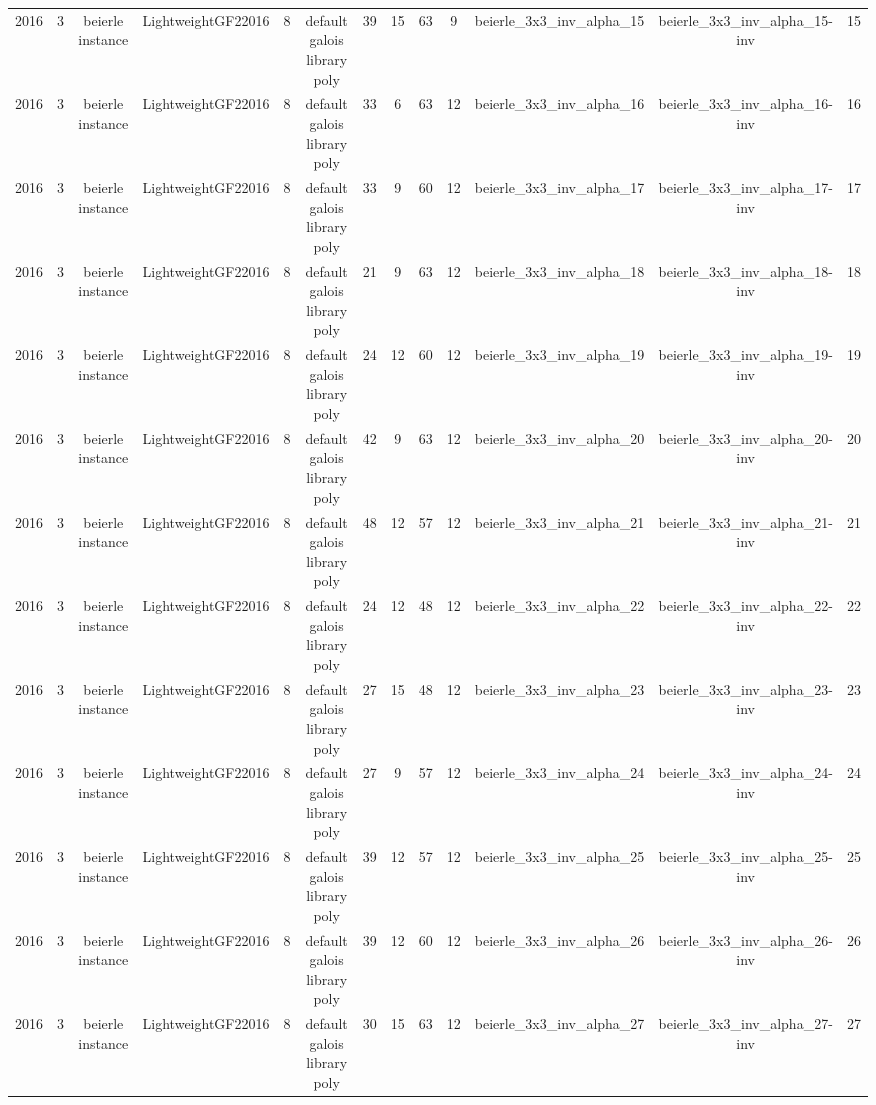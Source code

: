 \begin{tabular}{c c c c c c c c c c c c c}
2016 & 3 & beierle instance & LightweightGF22016 & 8 & default galois library poly & 39 & 15 & 63 & 9 & beierle_3x3_inv_alpha_15 & beierle_3x3_inv_alpha_15-inv & 15 \\
2016 & 3 & beierle instance & LightweightGF22016 & 8 & default galois library poly & 33 & 6 & 63 & 12 & beierle_3x3_inv_alpha_16 & beierle_3x3_inv_alpha_16-inv & 16 \\
2016 & 3 & beierle instance & LightweightGF22016 & 8 & default galois library poly & 33 & 9 & 60 & 12 & beierle_3x3_inv_alpha_17 & beierle_3x3_inv_alpha_17-inv & 17 \\
2016 & 3 & beierle instance & LightweightGF22016 & 8 & default galois library poly & 21 & 9 & 63 & 12 & beierle_3x3_inv_alpha_18 & beierle_3x3_inv_alpha_18-inv & 18 \\
2016 & 3 & beierle instance & LightweightGF22016 & 8 & default galois library poly & 24 & 12 & 60 & 12 & beierle_3x3_inv_alpha_19 & beierle_3x3_inv_alpha_19-inv & 19 \\
2016 & 3 & beierle instance & LightweightGF22016 & 8 & default galois library poly & 42 & 9 & 63 & 12 & beierle_3x3_inv_alpha_20 & beierle_3x3_inv_alpha_20-inv & 20 \\
2016 & 3 & beierle instance & LightweightGF22016 & 8 & default galois library poly & 48 & 12 & 57 & 12 & beierle_3x3_inv_alpha_21 & beierle_3x3_inv_alpha_21-inv & 21 \\
2016 & 3 & beierle instance & LightweightGF22016 & 8 & default galois library poly & 24 & 12 & 48 & 12 & beierle_3x3_inv_alpha_22 & beierle_3x3_inv_alpha_22-inv & 22 \\
2016 & 3 & beierle instance & LightweightGF22016 & 8 & default galois library poly & 27 & 15 & 48 & 12 & beierle_3x3_inv_alpha_23 & beierle_3x3_inv_alpha_23-inv & 23 \\
2016 & 3 & beierle instance & LightweightGF22016 & 8 & default galois library poly & 27 & 9 & 57 & 12 & beierle_3x3_inv_alpha_24 & beierle_3x3_inv_alpha_24-inv & 24 \\
2016 & 3 & beierle instance & LightweightGF22016 & 8 & default galois library poly & 39 & 12 & 57 & 12 & beierle_3x3_inv_alpha_25 & beierle_3x3_inv_alpha_25-inv & 25 \\
2016 & 3 & beierle instance & LightweightGF22016 & 8 & default galois library poly & 39 & 12 & 60 & 12 & beierle_3x3_inv_alpha_26 & beierle_3x3_inv_alpha_26-inv & 26 \\
2016 & 3 & beierle instance & LightweightGF22016 & 8 & default galois library poly & 30 & 15 & 63 & 12 & beierle_3x3_inv_alpha_27 & beierle_3x3_inv_alpha_27-inv & 27 \\

\end{tabular}
